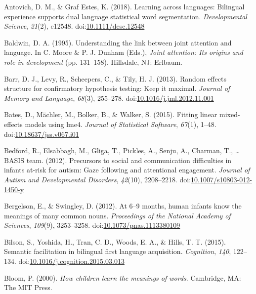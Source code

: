 \documentclass[,man,floatsintext]{apa6}
\begin{document}
\hypertarget{refs}{}
\leavevmode\hypertarget{ref-Antovich_GrafEstes_2017}{}%
Antovich, D. M., \& Graf Estes, K. (2018). Learning across languages: Bilingual experience supports dual language statistical word segmentation. \emph{Developmental Science}, \emph{21}(2), e12548. doi:\href{https://doi.org/10.1111/desc.12548}{10.1111/desc.12548}

\leavevmode\hypertarget{ref-Baldwin_1995}{}%
Baldwin, D. A. (1995). Understanding the link between joint attention and language. In C. Moore \& P. J. Dunham (Eds.), \emph{Joint attention: Its origins and role in development} (pp. 131--158). Hillsdale, NJ: Erlbaum.

\leavevmode\hypertarget{ref-Barr_etal_2013}{}%
Barr, D. J., Levy, R., Scheepers, C., \& Tily, H. J. (2013). Random effects structure for confirmatory hypothesis testing: Keep it maximal. \emph{Journal of Memory and Language}, \emph{68}(3), 255--278. doi:\href{https://doi.org/10.1016/j.jml.2012.11.001}{10.1016/j.jml.2012.11.001}

\leavevmode\hypertarget{ref-Bates_etal_2015}{}%
Bates, D., Mächler, M., Bolker, B., \& Walker, S. (2015). Fitting linear mixed-effects models using lme4. \emph{Journal of Statistical Software}, \emph{67}(1), 1--48. doi:\href{https://doi.org/10.18637/jss.v067.i01}{10.18637/jss.v067.i01}

\leavevmode\hypertarget{ref-Bedford_etal_2012}{}%
Bedford, R., Elsabbagh, M., Gliga, T., Pickles, A., Senju, A., Charman, T., \ldots{} BASIS team. (2012). Precursors to social and communication difficulties in infants at-risk for autism: Gaze following and attentional engagement. \emph{Journal of Autism and Developmental Disorders}, \emph{42}(10), 2208--2218. doi:\href{https://doi.org/10.1007/s10803-012-1450-y}{10.1007/s10803-012-1450-y}

\leavevmode\hypertarget{ref-Bergelson_Swingley_2012}{}%
Bergelson, E., \& Swingley, D. (2012). At 6--9 months, human infants know the meanings of many common nouns. \emph{Proceedings of the National Academy of Sciences}, \emph{109}(9), 3253--3258. doi:\href{https://doi.org/10.1073/pnas.1113380109}{10.1073/pnas.1113380109}

\leavevmode\hypertarget{ref-Bilson_etal_2015}{}%
Bilson, S., Yoshida, H., Tran, C. D., Woods, E. A., \& Hills, T. T. (2015). Semantic facilitation in bilingual first language acquisition. \emph{Cognition}, \emph{140}, 122--134. doi:\href{https://doi.org/10.1016/j.cognition.2015.03.013}{10.1016/j.cognition.2015.03.013}

\leavevmode\hypertarget{ref-Bloom_2000}{}%
Bloom, P. (2000). \emph{How children learn the meanings of words}. Cambridge, MA: The MIT Press.
\end{document}
